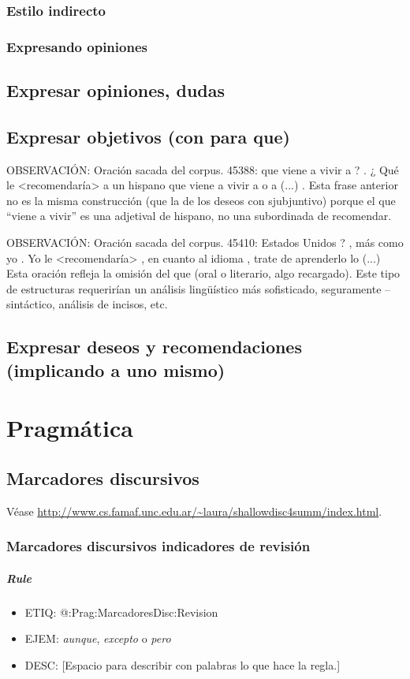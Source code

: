 \documentclass[11pt]{report}
\begin{document}
\subsection{Estilo indirecto}
\subsection{Expresando opiniones}
\section{Expresar opiniones, dudas}
\section{Expresar objetivos (con para que)}
OBSERVACIÓN: Oración sacada del corpus. 45388:  que viene a vivir a ? . ¿ Qué le <recomendaría> a un hispano que viene a vivir a o a (...) . Esta frase anterior no es la misma construcción (que la de los deseos con sjubjuntivo) porque el que ``viene a vivir'' es una adjetival de hispano, no una subordinada de recomendar.

OBSERVACIÓN:  Oración sacada del corpus. 45410:  Estados Unidos ? , más como yo . Yo le <recomendaría> , en cuanto al idioma , trate de aprenderlo lo (...) Esta oración refleja la omisión del que (oral o literario, algo recargado). Este tipo de estructuras requerirían un análisis lingüístico más sofisticado, seguramente -- sintáctico, análisis de incisos, etc.

\section{Expresar deseos y recomendaciones (implicando a uno mismo)}
\chapter{Pragmática}
\section{Marcadores discursivos}
Véase \url{http://www.cs.famaf.unc.edu.ar/~laura/shallowdisc4summ/index.html}.

\subsection{Marcadores discursivos indicadores de revisión}
\paragraph*{Rule}
\begin{itemize}
\item ETIQ: @:Prag:MarcadoresDisc:Revision
\item EJEM: \emph{aunque}, \emph{excepto} o \emph{pero}
\item DESC: [Espacio para describir con palabras lo que hace la regla.]
\end{itemize}
\end{document}

